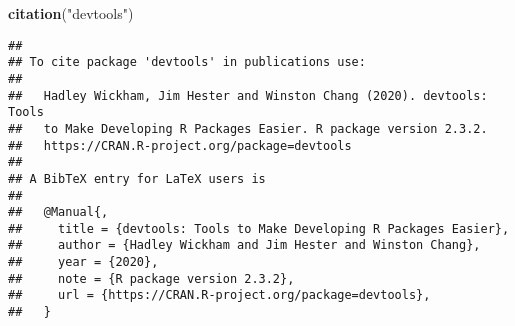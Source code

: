 \documentclass[
]{article}
\newenvironment{Shaded}{\begin{snugshade}}{\end{snugshade}}
\newcommand{\KeywordTok}[1]{\textcolor[rgb]{0.13,0.29,0.53}{\textbf{#1}}}
\newcommand{\NormalTok}[1]{#1}
\newcommand{\StringTok}[1]{\textcolor[rgb]{0.31,0.60,0.02}{#1}}
\begin{document}
\begin{Shaded}
\begin{Highlighting}[]
\KeywordTok{citation}\NormalTok{(}\StringTok{"devtools"}\NormalTok{)}
\end{Highlighting}
\end{Shaded}

\begin{verbatim}
## 
## To cite package 'devtools' in publications use:
## 
##   Hadley Wickham, Jim Hester and Winston Chang (2020). devtools: Tools
##   to Make Developing R Packages Easier. R package version 2.3.2.
##   https://CRAN.R-project.org/package=devtools
## 
## A BibTeX entry for LaTeX users is
## 
##   @Manual{,
##     title = {devtools: Tools to Make Developing R Packages Easier},
##     author = {Hadley Wickham and Jim Hester and Winston Chang},
##     year = {2020},
##     note = {R package version 2.3.2},
##     url = {https://CRAN.R-project.org/package=devtools},
##   }
\end{verbatim}
\end{document}
